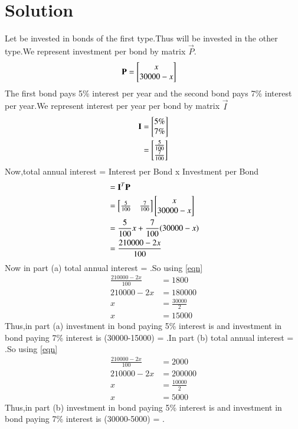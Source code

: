 \documentclass[journal,12pt,twocolumn]{IEEEtran}
\begin{document}
\section{\textbf{Solution}}
Let  be invested in bonds of the first type.Thus  will be invested in the other type.We represent investment per bond by matrix $\vec{P}$.
\begin{align}
\mathbf{P} &= \begin{bmatrix}x\\30000-x\end{bmatrix}  
\end{align}
The first bond pays 5\% interest per year and the second bond pays 7\% interest per year.We represent interest per year per bond by matrix $\vec{I}$
\begin{align}
  \mathbf{I} &= \begin{bmatrix}5\% \\ 7\%\end{bmatrix}\\
  &= \begin{bmatrix}\frac{5}{100} \\ \frac{7}{100}\end{bmatrix}
\end{align}
Now,total annual interest = Interest per Bond x Investment per Bond\\
\begin{align}
  &= \mathbf{I}^T \mathbf{P} \\
  &= \begin{bmatrix}\frac{5}{100} & \frac{7}{100}\end{bmatrix}\begin{bmatrix}x\\30000-x\end{bmatrix}\\
  &= \frac{5}{100}x+\frac{7}{100}(30000-x)\\
  &= \frac{210000-2x}{100} \label{eqn} 
\end{align}
Now in part (a) total annual interest = .So using \eqref{eqn}
\begin{align*}
  \frac{210000-2x}{100} &= 1800\\
  210000-2x &= 180000\\
  x &= \frac{30000}{2}\\
  x &= 15000
\end{align*}
Thus,in part (a) investment in bond paying 5\% interest is  and investment in bond paying 7\% interest is \rupee(30000-15000) = .In part (b) total annual interest = .So using \eqref{eqn}
\begin{align*}
  \frac{210000-2x}{100} &= 2000\\
  210000-2x &= 200000\\
  x &= \frac{10000}{2}\\
  x &= 5000
\end{align*}
Thus,in part (b) investment in bond paying 5\% interest is  and investment in bond paying 7\% interest is \rupee(30000-5000) = .
\end{document}
